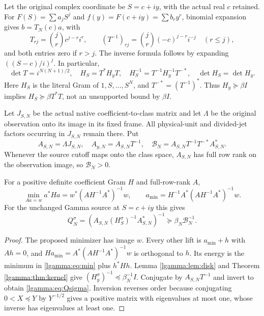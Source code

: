 \documentclass[11pt]{article}
\begin{document}
Let the original complex coordinate be $S=c+iy$, with the actual real
$c$ retained.  For $F(S)=\sum a_jS^j$ and $f(y)=F(c+iy)=\sum b_ry^r$,
binomial expansion gives $b=T_N(c)a$, with
\begin{equation}\label{lgamma:eq:T}
 T_{rj}=\binom jr c^{j-r}i^r,\qquad
 (T^{-1})_{rj}=\binom jr(-c)^{j-r}i^{-j}\quad(r\le j),
\end{equation}
and both entries zero if $r>j$.  The inverse formula follows by
expanding $((S-c)/i)^j$.  In particular,
\begin{equation}\label{lgamma:eq:Tgram}
 \det T=i^{N(N+1)/2},\quad H_S=T^*H_yT,\quad
 H_S^{-1}=T^{-1}H_y^{-1}T^{-*},\quad \det H_S=\det H_y.
\end{equation}
Here $H_S$ is the literal Gram of $1,S,\ldots,S^N$, and
$T^{-*}=(T^{-1})^*$.  Thus $H_y\succeq\beta I$ implies
$H_S\succeq\beta T^*T$, not an unsupported bound by $\beta I$.

Let $J_{S,N}$ be the actual native coefficient-to-class matrix and let
$\Lambda$ be the original observation onto its image in its fixed frame.
All physical-unit and divided-jet factors occurring in $J_{S,N}$ remain
there.  Put
\begin{equation}\label{lgamma:eq:A}
 A_{S,N}=\Lambda J_{S,N},\quad
 A_{y,N}=A_{S,N}T^{-1},\quad
 \mathcal B_N=A_{S,N}T^{-1}T^{-*}A_{S,N}^*.
\end{equation}
Whenever the source cutoff maps onto the class space, $A_{S,N}$ has full
row rank on the observation image, so $\mathcal B_N>0$.

\begin{lgammalemma}\label{lgamma:lem:min}
For a positive definite coefficient Gram $H$ and full-row-rank $A$,
\begin{equation}\label{lgamma:eq:min}
 \min_{Aa=w}a^*Ha=w^*(AH^{-1}A^*)^{-1}w,\qquad
 a_{\min}=H^{-1}A^*(AH^{-1}A^*)^{-1}w.
\end{equation}
For the unchanged Gamma source at $S=c+iy$ this gives
\begin{equation}\label{lgamma:eq:Qsigma}
 \boxed{Q_N^\sigma=(A_{S,N}(H_S^\sigma)^{-1}A_{S,N}^*)^{-1}
 \succeq\beta_N\mathcal B_N^{-1}.}
\end{equation}
\end{lgammalemma}
\begin{proof}
The proposed minimizer has image $w$.  Every other lift is $a_{\min}+h$
with $Ah=0$, and $Ha_{\min}=A^*(AH^{-1}A^*)^{-1}w$ is orthogonal
to $h$.  Its energy is the minimum in \eqref{lgamma:eq:min} plus $h^*Hh$.
Lemma \ref{lgamma:lem:disk} and Theorem \ref{lgamma:thm:kernel} give
$(H_y^\sigma)^{-1}\preceq\beta_N^{-1}I$.  Conjugate by
$A_{S,N}T^{-1}$ and invert to obtain \eqref{lgamma:eq:Qsigma}.  Inversion
reverses order because conjugating $0<X\preceq Y$ by $Y^{-1/2}$
gives a positive matrix with eigenvalues at most one, whose inverse has
eigenvalues at least one.
\end{proof}
\end{document}
